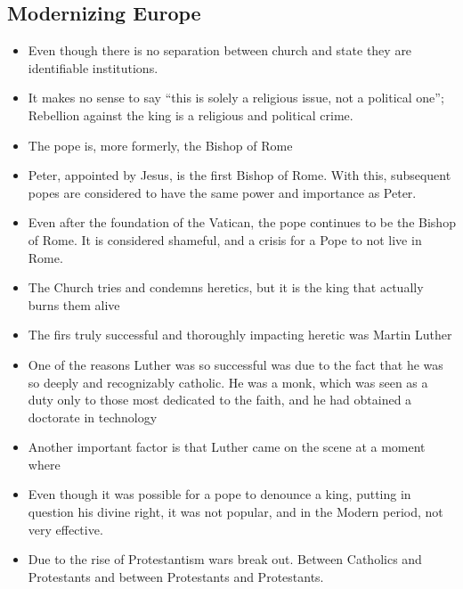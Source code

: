 \documentclass{article}
\begin{document}
\begin{spacing}{1.2}
    \section{Modernizing Europe}
    \begin{itemize}
        \item Even though there is no separation between church and state they
            are identifiable institutions.
        \item It makes no sense to say ``this is solely a religious issue, not a
            political one''; Rebellion against the king is a religious and political
            crime.
        \item The pope is, more formerly, the Bishop of Rome
        \item Peter, appointed by Jesus, is the first Bishop of Rome. With this,
            subsequent popes are considered to have the same power and importance
            as Peter.
        \item Even after the foundation of the Vatican, the pope continues to
            be the Bishop of Rome. It is considered shameful, and a crisis for a
            Pope to not live in Rome.
        \item The Church tries and condemns heretics, but it is the king that
            actually burns them alive
        \item The firs truly successful and thoroughly impacting heretic was
            Martin Luther
        \item One of the reasons Luther was so successful was due to the fact
            that he was so deeply and recognizably catholic. He was a monk, which
            was seen as a duty only to those most dedicated to the faith, and he
            had obtained a doctorate in technology
        \item Another important factor is that Luther came on the scene at a
            moment where
        \item Even though it was possible for a pope to denounce a king, putting
            in question his divine right, it was not popular, and in the Modern
            period, not very effective.
        \item Due to the rise of Protestantism wars break out. Between Catholics
            and Protestants and between Protestants and Protestants.
    \end{itemize}

\end{spacing}
\end{document}
